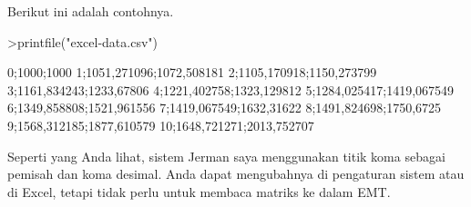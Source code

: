 \documentclass[12pt,Times new roman,letterpaper]{book}
\begin{document}
\begin{eulernootebook}
\begin{eulercomment}
\begin{eulercomment}
\begin{eulernootebook}
\begin{eulercomment}
\begin{eulercomment}
\begin{eulercomment}
\begin{eulercomment}
\begin{eulercomment}
\begin{eulercomment}
\begin{eulercomment}
\begin{eulercomment}
\begin{eulercomment}
\begin{eulercomment}
\begin{eulercomment}
\begin{eulercomment}
\begin{eulercomment}
\begin{eulercomment}
Berikut ini adalah contohnya.
\end{eulercomment}
\begin{eulerprompt}
>printfile("excel-data.csv")
\end{eulerprompt}
\begin{euleroutput}
  0;1000;1000
  1;1051,271096;1072,508181
  2;1105,170918;1150,273799
  3;1161,834243;1233,67806
  4;1221,402758;1323,129812
  5;1284,025417;1419,067549
  6;1349,858808;1521,961556
  7;1419,067549;1632,31622
  8;1491,824698;1750,6725
  9;1568,312185;1877,610579
  10;1648,721271;2013,752707
\end{euleroutput}
\begin{eulercomment}
Seperti yang Anda lihat, sistem Jerman saya menggunakan titik koma
sebagai pemisah dan koma desimal. Anda dapat mengubahnya di pengaturan
sistem atau di Excel, tetapi tidak perlu untuk membaca matriks ke
dalam EMT.


\end{eulercomment}
\end{eulercomment}
\end{eulercomment}
\end{eulercomment}
\end{eulercomment}
\end{eulercomment}
\end{eulercomment}
\end{eulercomment}
\end{eulercomment}
\end{eulercomment}
\end{eulercomment}
\end{eulercomment}
\end{eulercomment}
\end{eulercomment}
\end{eulernootebook}
\end{eulercomment}
\end{eulercomment}
\end{eulernootebook}
\end{document}
